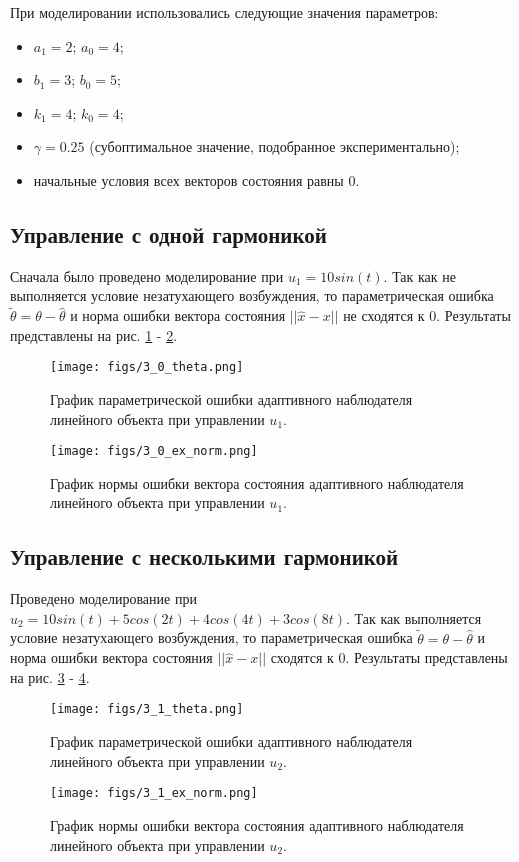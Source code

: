 \documentclass{article}
\begin{document}
При моделировании использовались следующие значения параметров: 
\begin{itemize}
  \item \(a_1 = 2\); \(a_0 = 4\);
  \item \(b_1 = 3\); \(b_0 = 5\);
  \item \(k_1 = 4\); \(k_0 = 4\);
  \item $\gamma=0.25$ (субоптимальное значение, подобранное экспериментально);
  \item начальные условия всех векторов состояния равны 0.
\end{itemize}

\newpage
\subsection{Управление с одной гармоникой}
Сначала было проведено моделирование при \(u_1 = 10 sin(t)\). 
Так как не выполняется условие незатухающего возбуждения, то параметрическая ошибка \(\tilde \theta = \theta - \hat \theta\) и норма ошибки вектора состояния \(||\hat x - x||\) не сходятся к 0. 
Результаты представлены на рис. \ref{fig:1_theta} - \ref{fig:1_xnorm}.
\begin{figure}[h!]
  \centering
  \texttt{[image: figs/3\_0\_theta.png]}
  \caption{График параметрической ошибки адаптивного наблюдателя линейного объекта при управлении \(u_1\).} 
  \label{fig:1_theta}
\end{figure}
\begin{figure}[h!]
  \centering
  \texttt{[image: figs/3\_0\_ex\_norm.png]}
  \caption{График нормы ошибки вектора состояния адаптивного наблюдателя линейного объекта при управлении \(u_1\).} 
  \label{fig:1_xnorm}
\end{figure}
\FloatBarrier
\newpage

\subsection{Управление с несколькими гармоникой}
Проведено моделирование при \(u_2 = 10 sin(t) + 5 cos(2t) + 4cos(4t) + 3cos(8t)\). 
Так как выполняется условие незатухающего возбуждения, то параметрическая ошибка \(\tilde \theta = \theta - \hat \theta\) и норма ошибки вектора состояния \(||\hat x - x||\) сходятся к 0. 
Результаты представлены на рис. \ref{fig:2_theta} - \ref{fig:2_xnorm}.
\begin{figure}[h!]
  \centering
  \texttt{[image: figs/3\_1\_theta.png]}
  \caption{График параметрической ошибки адаптивного наблюдателя линейного объекта при управлении \(u_2\).} 
  \label{fig:2_theta}
\end{figure}
\begin{figure}[h!]
  \centering
  \texttt{[image: figs/3\_1\_ex\_norm.png]}
  \caption{График нормы ошибки вектора состояния адаптивного наблюдателя линейного объекта при управлении \(u_2\).} 
  \label{fig:2_xnorm}
\end{figure}
\FloatBarrier
\newpage
\end{document}
